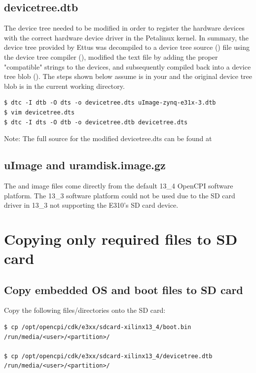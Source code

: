 \begin{appendices}
\subsection{devicetree.dtb}
The device tree needed to be modified in order to register the hardware devices with the correct hardware device driver in the Petalinux kernel. In summary, the device tree provided by Ettus was decompiled to a device tree source () file using the device tree compiler (), modified the text file by adding the proper "compatible" strings to the devices, and subsequently compiled back into a device tree blob (). The steps shown below assume  is in your  and the original device tree blob is in the current working directory.
\begin{lstlisting}[showspaces=false]
$ dtc -I dtb -O dts -o devicetree.dts uImage-zynq-e31x-3.dtb
$ vim devicetree.dts
$ dtc -I dts -O dtb -o devicetree.dtb devicetree.dts
\end{lstlisting}
Note: The full source for the modified devicetree.dts can be found at

\subsection{uImage and uramdisk.image.gz}
The  and  image files come directly from the default 13\_4 OpenCPI software platform. The 13\_3 software platform could not be used due to the SD card driver in 13\_3 not supporting the E310's SD card device.

\section{Copying only required files to SD card}
\label{app:sd_card_copy_files}

\subsection{Copy embedded OS and boot files to SD card}
\label{sec:Copy embedded OS and boot files to SD card}
\noindent Copy the following files/directories onto the SD card:
\begin{verbatim}
$ cp /opt/opencpi/cdk/e3xx/sdcard-xilinx13_4/boot.bin /run/media/<user>/<partition>/

$ cp /opt/opencpi/cdk/e3xx/sdcard-xilinx13_4/devicetree.dtb /run/media/<user>/<partition>/


\end{verbatim}
\end{appendices}
